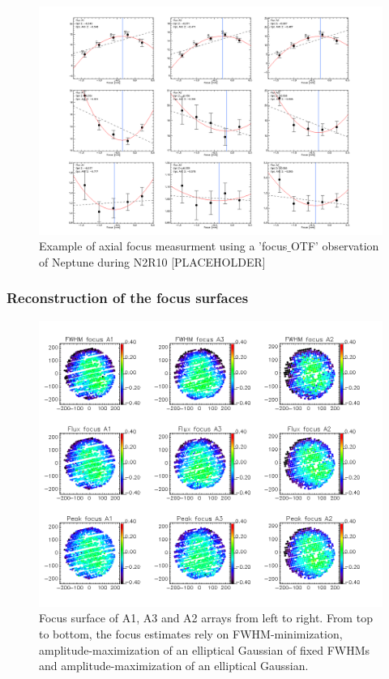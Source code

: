 \begin{figure}
\begin{center}
  \includegraphics[clip, angle=0, scale=0.25]{Figures/plot_20170419s143.png}
\caption{Example of axial focus measurment using a 'focus$\_$OTF' observation of Neptune
during N2R10 [PLACEHOLDER]}
\label{fig:focus-example}
\end{center}
\end{figure}


\subsubsection{Reconstruction of the focus surfaces}
\label{sec:focus-surf}

\begin{figure}
\begin{center}
  \includegraphics[trim={0, 1cm, 0, 1cm}, clip, angle=0, scale=0.5]{Figures/fov_focus_mv_5.png}
\caption{Focus surface of A1, A3 and A2 arrays from left to
  right. From top to bottom, the focus estimates rely on
  FWHM-minimization, amplitude-maximization of an elliptical
  Gaussian of fixed FWHMs and amplitude-maximization of an elliptical
  Gaussian.}
\label{fig:focus-surfaces}
\end{center}
\end{figure}


